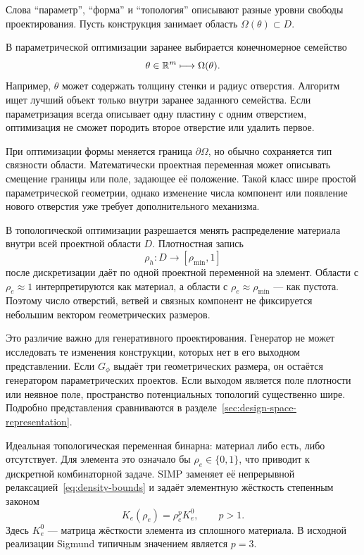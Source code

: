 Слова ``параметр'', ``форма'' и ``топология'' описывают разные уровни свободы проектирования. Пусть конструкция занимает область $\Omega(\theta)\subset D$.

В параметрической оптимизации заранее выбирается конечномерное семейство
\begin{equation}
 \theta\in\mathbb{R}^m
 \longmapsto
 \Omega(\theta).
\end{equation}
Например, $\theta$ может содержать толщину стенки и радиус отверстия. Алгоритм ищет лучший объект только внутри заранее заданного семейства. Если параметризация всегда описывает одну пластину с одним отверстием, оптимизация не сможет породить второе отверстие или удалить первое.

При оптимизации формы меняется граница $\partial\Omega$, но обычно сохраняется тип связности области. Математически проектная переменная может описывать смещение границы или поле, задающее её положение. Такой класс шире простой параметрической геометрии, однако изменение числа компонент или появление нового отверстия уже требует дополнительного механизма.

В топологической оптимизации разрешается менять распределение материала внутри всей проектной области $D$. Плотностная запись
\begin{equation}
 \rho_h:D\to[\rho_{\min},1]
\end{equation}
после дискретизации даёт по одной проектной переменной на элемент. Области с $\rho_e\approx1$ интерпретируются как материал, а области с $\rho_e\approx\rho_{\min}$ --- как пустота. Поэтому число отверстий, ветвей и связных компонент не фиксируется небольшим вектором геометрических размеров.

Это различие важно для генеративного проектирования. Генератор не может исследовать те изменения конструкции, которых нет в его выходном представлении. Если $G_\phi$ выдаёт три геометрических размера, он остаётся генератором параметрических проектов. Если выходом является поле плотности или неявное поле, пространство потенциальных топологий существенно шире. Подробно представления сравниваются в разделе~\ref{sec:design-space-representation}.

Идеальная топологическая переменная бинарна: материал либо есть, либо отсутствует. Для элемента это означало бы $\rho_e\in\{0,1\}$, что приводит к дискретной комбинаторной задаче. SIMP заменяет её непрерывной релаксацией~\eqref{eq:density-bounds} и задаёт элементную жёсткость степенным законом
\begin{equation}
\label{eq:simp-element-stiffness}
 K_e(\rho_e)=\rho_e^p K_e^0,
 \qquad p>1.
\end{equation}
Здесь $K_e^0$ --- матрица жёсткости элемента из сплошного материала. В исходной реализации Sigmund типичным значением является $p=3$.

